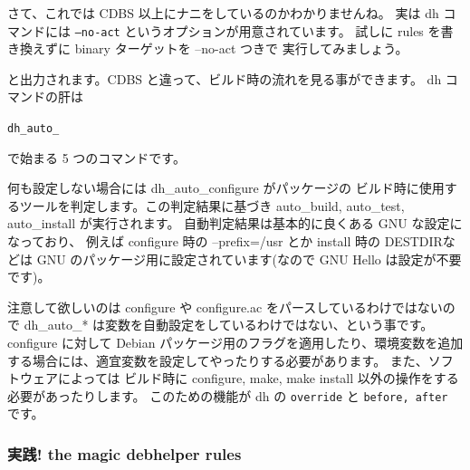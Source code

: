 \documentclass[mingoth,a4paper]{jsarticle}
\begin{document}
さて、これでは CDBS 以上にナニをしているのかわかりませんね。
実は dh コマンドには {\tt --no-act} というオプションが用意されています。
試しに rules を書き換えずに binary ターゲットを --no-act つきで
実行してみましょう。
と出力されます。CDBS と違って、ビルド時の流れを見る事ができます。
dh コマンドの肝は
\begin{center}
    {\tt dh\_auto\_}
\end{center}
で始まる 5 つのコマンドです。

何も設定しない場合には dh\_auto\_configure がパッケージの
ビルド時に使用するツールを判定します。この判定結果に基づき
auto\_build, auto\_test, auto\_install が実行されます。
自動判定結果は基本的に良くある GNU な設定になっており、
例えば configure 時の --prefix=/usr とか install 時の DESTDIRなどは
GNU のパッケージ用に設定されています(なので GNU Hello は設定が不要です)。

注意して欲しいのは configure や configure.ac をパースしているわけではないので
dh\_auto\_* は変数を自動設定をしているわけではない、という事です。
configure に対して Debian パッケージ用のフラグを適用したり、環境変数を追加
する場合には、適宜変数を設定してやったりする必要があります。
%
また、ソフトウェアによっては
ビルド時に configure, make, make install 以外の操作をする必要があったりします。
このための機能が dh の {\tt override} と {\tt before, after} です。

\subsubsection{実践! the magic debhelper rules}
\end{document}
